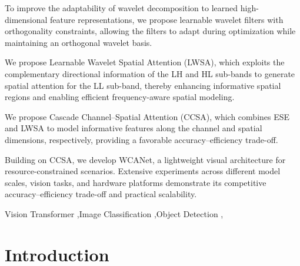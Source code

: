 \documentclass[a4paper,fleqn]{cas-dc}
\begin{document}
\begin{highlights}

{\color{blue}

\item To improve the adaptability of wavelet decomposition to learned high-dimensional feature representations, we propose learnable wavelet filters with orthogonality constraints, allowing the filters to adapt during optimization while maintaining an orthogonal wavelet basis.

\item We propose Learnable Wavelet Spatial Attention (LWSA), which exploits the complementary directional information of the LH and HL sub-bands to generate spatial attention for the LL sub-band, thereby enhancing informative spatial regions and enabling efficient frequency-aware spatial modeling.

\item We propose Cascade Channel--Spatial Attention (CCSA), which combines ESE and LWSA to model informative features along the channel and spatial dimensions, respectively, providing a favorable accuracy--efficiency trade-off.

\item Building on CCSA, we develop WCANet, a lightweight visual architecture for resource-constrained scenarios. Extensive experiments across different model scales, vision tasks, and hardware platforms demonstrate its competitive accuracy--efficiency trade-off and practical scalability.

}
\end{highlights}

\begin{keywords}
Vision Transformer \sep Image Classification \sep Object Detection \sep 
\end{keywords}


\maketitle



\section{Introduction}
\end{document}
